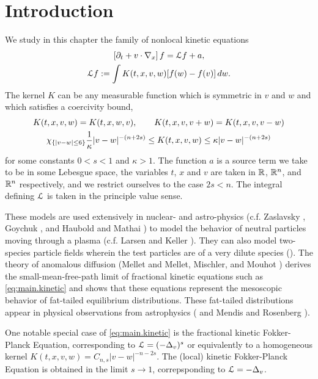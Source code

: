\section{Introduction}\label{sec:intro}

We study in this chapter the family of nonlocal kinetic equations
\begin{gather} \label{eq:main.kinetic}
\left[ \partial_t + v\cdot \nabla_x \right] f = \mathcal{L} f + a, \\
\mathcal{L} f := \int K(t,x,v,w) [f(w)-f(v)] \, dw. \nonumber
\end{gather}
The kernel $K$ can be any measurable function which is symmetric in $v$ and $w$ and which satisfies a coercivity bound,
\begin{equation}\label{eq:kappa_bound} \begin{gathered}
K(t,x,v,w) = K(t,x,w,v), \qquad K(t,x,v,v+w) = K(t,x,v,v-w) \\
\chi_{\{|v-w| \leq 6\}} \frac{1}{\kappa} |v-w|^{-(n+2s)} \leq K(t,x,v,w) \leq \kappa |v-w|^{-(n+2s)}
\end{gathered}\end{equation}
for some constants $0 < s < 1$ and $\kappa > 1$.  The function $a$ is a source term we take to be in some Lebesgue space, the variables $t$, $x$ and $v$ are taken in $\mathbb{R}$, $\mathbb{R}^n$, and $\mathbb{R}^n$ respectively, and we restrict ourselves to the case $2s < n$. The integral defining $\mathcal{L}$ is taken in the principle value sense.  

These models are used extensively in nuclear- and astro-physics (c.f. Zaslavsky \cite{Za}, Goychuk \cite{Go.physics}, and Haubold and Mathai \cite{HaMa}) to model the behavior of neutral particles moving through a plasma (c.f. Larsen and Keller \cite{LaKe}).  They can also model two-species particle fields wherein the test particles are of a very dilute species (\cite{Go.physics}).   The theory of anomalous diffusion (Mellet \cite{Me} and Mellet, Mischler, and Mouhot \cite{MeMiMo}) derives the small-mean-free-path limit of fractional kinetic equations such as \eqref{eq:main.kinetic} and shows that these equations represent the mesoscopic behavior of fat-tailed equilibrium distributions.  These fat-tailed distributions appear in physical observations from astrophysics (\cite{LaKe} and Mendis and Rosenberg \cite{MeRo}).  

One notable special case of \eqref{eq:main.kinetic} is the fractional kinetic Fokker-Planck Equation, corresponding to $\mathcal{L} = (-\Delta_v)^s$ or equivalently to a homogeneous kernel $K(t,x,v,w) = C_{n,s} |v-w|^{-n-2s}$.  The (local) kinetic Fokker-Planck Equation is obtained in the limit $s \to 1$, correpsponding to $\mathcal{L} = - \Delta_v$.  

